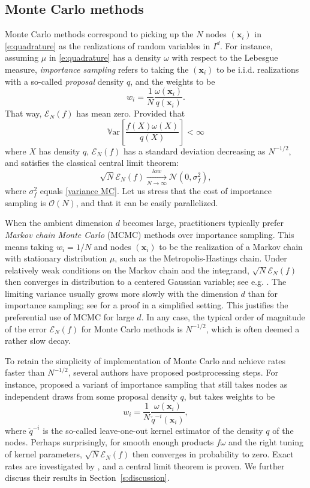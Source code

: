 \documentclass[a4paper,11pt]{article}
\numberwithin{equation}{section}
\theoremstyle{definition}
\newcommand{\rev}[1]{#1}
\newcommand{\eq}{\begin{equation}}
\newcommand{\qe}{\end{equation}}
\newcommand{\cO}{\mathcal{O}}
\newcommand{\bv}{\mathbf}
\newcommand{\Var}{\mathbb{V}{\mathrm{ar}}}
\def\bx{{\bv x}}
\def\cE{\mathscr{E}}
\begin{document}
\subsection{Monte Carlo methods}
\label{s:monteCarlo}
Monte Carlo methods \citep{RoCa04} correspond to picking up the $N$ nodes $(\bx_i)$ in
\eqref{e:quadrature} as the realizations of random variables in $I^d$. For instance,
assuming $\mu$ in \eqref{e:quadrature} has a density $\omega$ with respect to the
Lebesgue measure, \emph{importance sampling} refers to taking the $(\bx_i)$ to be
i.i.d. realizations with a so-called \emph{proposal} density $q$, and the
weights to be
\eq
\label{e:isWeights}
w_i = \frac{1}{N}\frac{\omega(\bx_i)}{q(\bx_i)}.
\qe
That way, $\cE_N(f)$ has mean zero. Provided that
\eq
\label{variance MC}
\Var \left[\frac{f(X)\omega(X)}{q(X)}\right]<\infty
\qe
where $X$ has density $q$, $\cE_N(f)$ has a standard deviation decreasing as $N^{-1/2}$, and satisfies the
classical central limit theorem: $$\sqrt N\cE_N(f)\xrightarrow[N\to\infty]{law} \mathcal N(0,\sigma_f^2),$$
where $\sigma_f^2$ equals \eqref{variance MC}. Let us stress that the cost of
importance sampling is $\cO(N)$, and that it can be easily parallelized.

When the ambient dimension $d$ becomes large, practitioners typically prefer \emph{Markov chain
  Monte Carlo} (MCMC) methods over importance sampling. This means taking $w_i=1/N$ and nodes $(\bx_i)$ to be
the realization of a Markov chain with stationary distribution $\mu$, such as the
Metropolis-Hastings chain. Under relatively weak conditions on the Markov chain and the integrand,
$\sqrt N\cE_N(f)$ then converges in distribution to a centered Gaussian
variable; see e.g. \citep[Theorem 7.32]{DoMoSt14}. The limiting variance usually grows more slowly
with the dimension $d$ than for
importance sampling; see \citep{BeCh09} for a proof in a simplified setting. This justifies the preferential use of MCMC for large $d$. In any case, the typical order of
magnitude of the error $\cE_N(f)$ for Monte Carlo methods is $N^{-1/2}$, which
is often deemed a rather slow decay.

\rev{To retain the simplicity of implementation of Monte Carlo and achieve rates faster than $N^{-1/2}$, several authors have proposed postprocessing steps.} For instance, \cite{DePo16} proposed a variant of importance sampling that still takes nodes as independent draws from some proposal density $q$, but takes weights to be
\begin{equation}
w_i = \frac{1}{N}\frac{\omega(\bx_i)}{\check{q}^{-i}(\bx_i)},
\label{e:delyonPortierWeights}
\end{equation}
where $\check{q}^{-i}$ is the so-called leave-one-out kernel estimator of the density $q$ of the nodes. Perhaps surprisingly, for smooth enough products $f\omega$ and the right tuning
of kernel parameters, $\sqrt{N}\cE_N(f)$
then converges in probability to zero. Exact rates are investigated by
\cite{DePo16}, and a central limit theorem is proven. We further discuss
their results in Section~\ref{s:discussion}.
\end{document}
